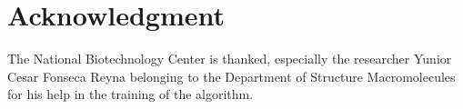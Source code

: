 \documentclass[runningheads]{llncs}
\begin{document}
\section{Acknowledgment}
The National Biotechnology Center is thanked, especially the researcher Yunior Cesar Fonseca Reyna belonging to the Department of Structure Macromolecules for his help in the training of the algorithm.
%
%
%


%
\end{document}

